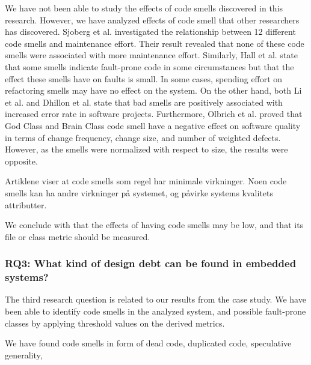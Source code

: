 We have not been able to study the effects of code smells discovered in this research. However, we have analyzed effects of code smell that other researchers has discovered. Sjoberg et al.\cite{sjoberg2013quantifying} investigated the relationship between 12 different code smells and maintenance effort. Their result revealed that none of these code smells were associated with more maintenance effort. Similarly, Hall et al.\cite{hall2014some} state that some smells indicate fault-prone code in some circumstances but that the effect these smells have on faults is small. In some cases, spending effort on refactoring smells may have no effect on the system. On the other hand, both Li et al. and Dhillon et al. state that bad smells are positively associated with increased error rate in software projects. Furthermore, Olbrich et al. proved that God Class and Brain Class code smell have a negative effect on software quality in terms of change frequency, change size, and number of weighted defects. However, as the smells were normalized with respect to size, the results were opposite. 

Artiklene viser at code smells som regel har minimale virkninger. Noen code smells kan ha andre virkninger på systemet, og påvirke systems kvalitets attributter. 

We conclude with that the effects of having code smells may be low, and that its file or class metric should be measured.



\subsubsection{RQ3: What kind of design debt can be found in embedded systems?} 

The third research question is related to our results from the case study. We have been able to identify code smells in the analyzed system, and possible fault-prone classes by applying threshold values on the derived metrics.

We have found code smells in form of dead code, duplicated code, speculative generality, 


